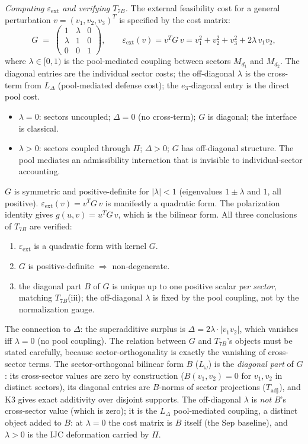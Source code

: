 \documentclass[11pt]{article}
\theoremstyle{definition}
\newenvironment{varlist}{\begin{itemize}[nosep,leftmargin=2em]}{\end{itemize}}
\begin{document}
\smallskip\noindent\textit{Computing $\varepsilon_{\mathrm{ext}}$ and
verifying $T_{7B}$.}\quad
The external feasibility cost for a general perturbation
$v = (v_1, v_2, v_3)^T$ is specified by the cost matrix:
\[
  G \;=\; \begin{pmatrix}
    1 & \lambda & 0 \\
    \lambda & 1 & 0 \\
    0 & 0 & 1
  \end{pmatrix},
  \qquad
  \varepsilon_{\mathrm{ext}}(v) = v^T G\, v
  = v_1^2 + v_2^2 + v_3^2 + 2\lambda\, v_1 v_2,
\]
where $\lambda \in [0, 1)$ is the pool-mediated coupling between sectors
$M_{d_1}$ and $M_{d_2}$.  The diagonal entries are the individual sector
costs; the off-diagonal $\lambda$ is the cross-term from $L_\Delta$
(pool-mediated defense cost); the $e_3$-diagonal entry is the direct
pool cost.

\begin{varlist}
  \item $\lambda = 0$: sectors uncoupled; $\Delta = 0$ (no cross-term);
  $G$ is diagonal; the interface is classical.
  \item $\lambda > 0$: sectors coupled through $\Pi$; $\Delta > 0$;
  $G$ has off-diagonal structure.  The pool mediates an admissibility
  interaction that is invisible to individual-sector accounting.
\end{varlist}

\noindent $G$ is symmetric and positive-definite for $|\lambda| < 1$
(eigenvalues $1 \pm \lambda$ and $1$, all positive).
$\varepsilon_{\mathrm{ext}}(v) = v^T G\, v$ is manifestly a quadratic
form.  The polarization identity gives $g(u,v) = u^T G\, v$, which is
the bilinear form.  All three conclusions of $T_{7B}$ are verified:
\begin{enumerate}[label=(\roman*),nosep]
  \item $\varepsilon_{\mathrm{ext}}$ is a quadratic form with kernel $G$.
  \item $G$ is positive-definite $\Rightarrow$ non-degenerate.
  \item the diagonal part $B$ of $G$ is unique up to one positive
  scalar \emph{per sector}, matching $T_{7B}$(iii); the off-diagonal
  $\lambda$ is fixed by the pool coupling, not by the normalization
  gauge.
\end{enumerate}

The connection to $\Delta$: the superadditive surplus is
$\Delta = 2\lambda \cdot |v_1 v_2|$, which vanishes iff $\lambda = 0$
(no pool coupling).  The relation between $G$ and $T_{7B}$'s objects
must be stated carefully, because sector-orthogonality is exactly the
vanishing of cross-sector terms.  The sector-orthogonal bilinear form
$B$ ($L_\omega$) is the \emph{diagonal part} of $G$: its cross-sector
values are zero by construction ($B(v_1, v_2) = 0$ for $v_1, v_2$ in
distinct sectors), its diagonal entries are $B$-norms of sector
projections ($T_{\mathrm{adj}}$), and K3 gives exact additivity over
disjoint supports.  The off-diagonal $\lambda$ is \emph{not} $B$'s
cross-sector value (which is zero); it is the $L_\Delta$ pool-mediated
coupling, a distinct object added to $B$: at $\lambda = 0$ the cost
matrix is $B$ itself (the Sep baseline), and $\lambda > 0$ is the IJC
deformation carried by $\Pi$.
\end{document}
